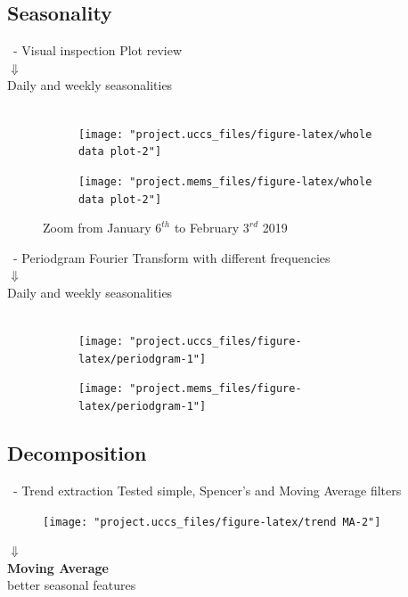 \documentclass{beamer}
\begin{document}
\subsection{Seasonality}
\begin{frame}{\subsecname~- Visual inspection}
	\centering Plot review\\
	$\Downarrow$\\ %
	Daily and weekly seasonalities\\~
	\begin{figure}
		\begin{subfigure}{.49\linewidth}
			\texttt{[image: "project.uccs\_files/figure-latex/whole data plot-2"]}
		\end{subfigure}
		\begin{subfigure}{.49\linewidth}
			\texttt{[image: "project.mems\_files/figure-latex/whole data plot-2"]}
		\end{subfigure}
		\caption{Zoom from January $6^{th}$ to February $3^{rd}$ 2019}
	\end{figure}
\end{frame}

\begin{frame}{\subsecname~- Periodgram}
	\centering Fourier Transform with different frequencies\\
	$\Downarrow$\\ %
	Daily and weekly seasonalities\\~
	\begin{figure}
		\begin{subfigure}{.49\linewidth}
			\texttt{[image: "project.uccs\_files/figure-latex/periodgram-1"]}
		\end{subfigure}
		\begin{subfigure}{.49\linewidth}
			\texttt{[image: "project.mems\_files/figure-latex/periodgram-1"]}
		\end{subfigure}
	\end{figure}
\end{frame}

\subsection{Decomposition}
\begin{frame}{\subsecname~- Trend extraction}\centering
	Tested simple, Spencer's and Moving Average filters
	\begin{figure}
		\texttt{[image: "project.uccs\_files/figure-latex/trend MA-2"]}
	\end{figure}
	\large$\Downarrow$\\\normalsize\textbf{Moving Average}\\\small better seasonal features
\end{frame}
\end{document}
